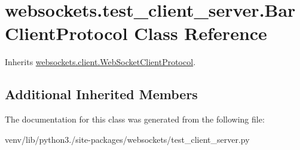\hypertarget{classwebsockets_1_1test__client__server_1_1_bar_client_protocol}{}\section{websockets.\+test\+\_\+client\+\_\+server.\+Bar\+Client\+Protocol Class Reference}
\label{classwebsockets_1_1test__client__server_1_1_bar_client_protocol}


Inherits \hyperlink{classwebsockets_1_1client_1_1_web_socket_client_protocol}{websockets.\+client.\+Web\+Socket\+Client\+Protocol}.

\subsection*{Additional Inherited Members}


The documentation for this class was generated from the following file\+:\begin{DoxyCompactItemize}
\item 
venv/lib/python3./site-\/packages/websockets/test\+\_\+client\+\_\+server.\+py\end{DoxyCompactItemize}
